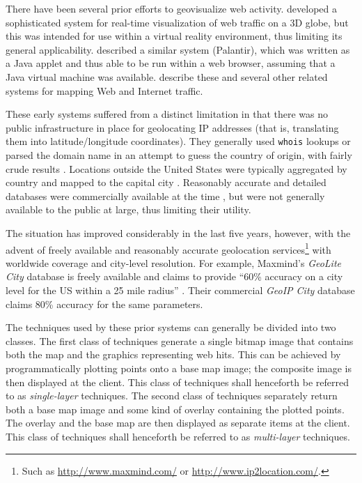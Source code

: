 \documentclass[acmnow]{acmtrans2m}
\begin{document}
There have been several prior efforts to geovisualize web activity.
 developed a sophisticated system for
real-time visualization of web traffic on a 3D globe, but this was
intended for use within a virtual reality environment, thus limiting its
general applicability.  described a similar
system (Palantir), which was written as a Java applet and thus able to
be run within a web browser, assuming that a Java virtual machine was
available.  describe these
and several other related systems for mapping Web and Internet traffic.

These early systems suffered from a distinct limitation in that there
was no public infrastructure in place for geolocating IP addresses (that
is, translating them into latitude/longitude coordinates). They
generally used \texttt{whois} lookups or parsed the domain name in an
attempt to guess the country of origin, with fairly crude results
\cite{Lamm-SE-1996-webvis}. Locations outside the United States were
typically aggregated by country and mapped to the capital city
\cite{Lamm-SE-1996-webvis,Papa-N-1998-Palantir,Jian-B-2000-cybermap}.
Reasonably accurate and detailed databases were commercially available
at the time \cite[p.\ 1466]{Lamm-SE-1996-webvis}, but were not generally
available to the public at large, thus limiting their utility.

The situation has improved considerably in the last five years, however,
with the advent of freely available and reasonably accurate geolocation
services\footnote{Such as \url{http://www.maxmind.com/} or
\url{http://www.ip2location.com/}.} with worldwide coverage and
city-level resolution. For example, Maxmind's \emph{GeoLite City}
database is freely available and claims to provide ``60\% accuracy on a
city level for the US within a 25 mile radius''
\cite{Maxm-G-2006-GeoLiteCity}. Their commercial \emph{GeoIP City}
database claims 80\% accuracy for the same parameters.

The techniques used by these prior systems can generally be divided into
two classes. The first class of techniques generate a single bitmap
image that contains both the map and the graphics representing web hits.
This can be achieved by programmatically plotting points onto a base map
image; the composite image is then displayed at the client. This class
of techniques shall henceforth be referred to as \emph{single-layer}
techniques. The second class of techniques separately return both a base
map image and some kind of overlay containing the plotted points. The
overlay and the base map are then displayed as separate items at the
client. This class of techniques shall henceforth be referred to as
\emph{multi-layer} techniques.
\end{document}
